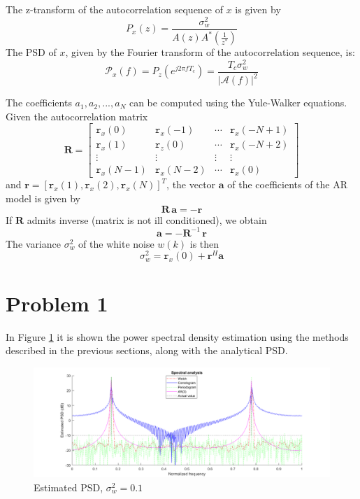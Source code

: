 \documentclass[a4paper, 12pt]{report}
\begin{document}
The z-transform of the autocorrelation sequence of $x$ is given by
\begin{equation}
	P_x(z) = \frac{\sigma_w^2}{A(z) A^{*} \left( \frac{1}{z^{*}} \right) }
\end{equation}
The PSD of $x$, given by the Fourier transform of the autocorrelation sequence, is:
\begin{equation}
	\mathcal{P}_x(f) = P_z(e^{j 2 \pi f T_c})= \frac{T_c \sigma_w^2}{|\mathcal{A}(f)|^2}
\end{equation}

The coefficients $a_1, a_2, ..., a_N$ can be computed using the Yule-Walker equations. Given the autocorrelation matrix
\begin{equation}
\mathbf{R} =
\begin{bmatrix}
\mathtt{r}_x(0)		&	\mathtt{r}_x(-1) 	& \cdots &	\mathtt{r}_x(-N+1) \\
\mathtt{r}_x(1)		&	\mathtt{r}_z(0)  	& \cdots &	\mathtt{r}_x(-N+2) \\
\vdots				&	\vdots        		& \vdots &	\vdots \\
\mathtt{r}_x(N-1)	&	\mathtt{r}_x(N-2)	& \cdots &	\mathtt{r}_x(0)
\end{bmatrix}
\end{equation}
and $ \mathbf{r} = [\mathtt{r}_x(1),  \mathtt{r}_x(2),  \mathtt{r}_x(N)]^T $, the vector $\mathbf{a}$ of the coefficients of the AR model is given by
\begin{equation}\label{eq:yulewalker}
	\mathbf{R} \, \mathbf{a} = - \mathbf{r}
\end{equation}
If $\mathbf{R}$ admits inverse (matrix is not ill conditioned), we obtain
\begin{equation}
	\mathbf{a} = -\mathbf{R}^{-1} \, \mathbf{r}
\end{equation}
The variance $\sigma_w ^2$ of the white noise $w(k)$ is then
\begin{equation}
	\sigma_w ^2 = \mathtt{r}_x(0) + \mathbf{r}^H \mathbf{a}
\end{equation}


\section*{Problem 1}
In Figure \ref{fig:estimatedpsd01} it is shown the power spectral density estimation using the methods described in the previous sections, along with the analytical PSD.

\begin{figure}[H]
	\centering
	\includegraphics[width=1\textwidth]{estimatedpsd01}
	\caption{Estimated PSD, $\sigma_w^2 = 0.1$}
	\label{fig:estimatedpsd01}
\end{figure}
\end{document}
